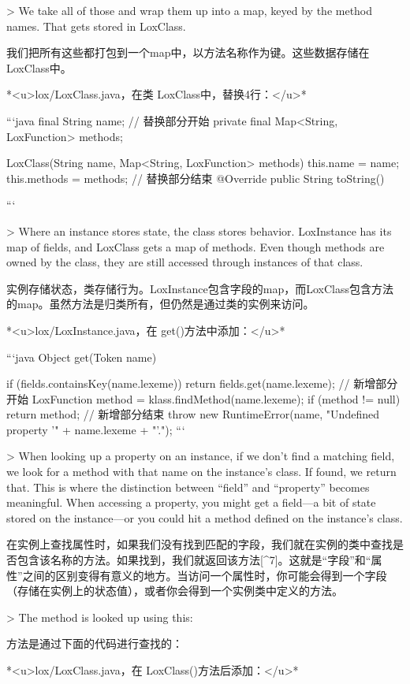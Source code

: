 \documentclass[cn,11pt,chinese]{elegantbook}
\begin{document}
{{{{{{{{{{{{{{{{{{{> We take all of those and wrap them up into a map, keyed by the method names. That gets stored in LoxClass.

我们把所有这些都打包到一个map中，以方法名称作为键。这些数据存储在LoxClass中。

*<u>lox/LoxClass.java，在类 LoxClass中，替换4行：</u>*

```java
  final String name;
  // 替换部分开始
  private final Map<String, LoxFunction> methods;

  LoxClass(String name, Map<String, LoxFunction> methods) {
    this.name = name;
    this.methods = methods;
  }
  // 替换部分结束
  @Override
  public String toString() {
```

> Where an instance stores state, the class stores behavior. LoxInstance has its map of fields, and LoxClass gets a map of methods. Even though methods are owned by the class, they are still accessed through instances of that class.

实例存储状态，类存储行为。LoxInstance包含字段的map，而LoxClass包含方法的map。虽然方法是归类所有，但仍然是通过类的实例来访问。

*<u>lox/LoxInstance.java，在 get()方法中添加：</u>*

```java
  Object get(Token name) {
    if (fields.containsKey(name.lexeme)) {
      return fields.get(name.lexeme);
    }
    // 新增部分开始
    LoxFunction method = klass.findMethod(name.lexeme);
    if (method != null) return method;
    // 新增部分结束
    throw new RuntimeError(name, 
        "Undefined property '" + name.lexeme + "'.");
```

> When looking up a property on an instance, if we don’t find a matching field, we look for a method with that name on the instance’s class. If found, we return that. This is where the distinction between “field” and “property” becomes meaningful. When accessing a property, you might get a field—a bit of state stored on the instance—or you could hit a method defined on the instance’s class.

在实例上查找属性时，如果我们没有找到匹配的字段，我们就在实例的类中查找是否包含该名称的方法。如果找到，我们就返回该方法[^7]。这就是“字段”和“属性”之间的区别变得有意义的地方。当访问一个属性时，你可能会得到一个字段（存储在实例上的状态值），或者你会得到一个实例类中定义的方法。

> The method is looked up using this:

方法是通过下面的代码进行查找的：

*<u>lox/LoxClass.java，在 LoxClass()方法后添加：</u>*

}}}}}}}}}}}}}}}}}}}}}
\end{document}
